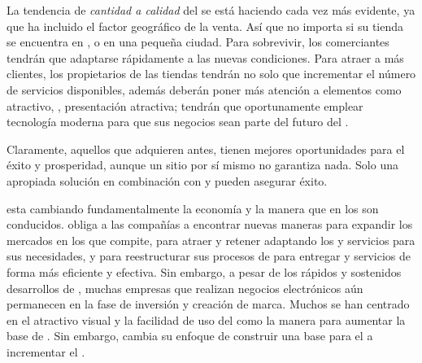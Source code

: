 			La tendencia de \textit{cantidad a calidad} del \ecommerceCOM se está haciendo cada vez más evidente, ya que \internetINT ha incluido el factor geográfico de la venta. Así que no importa si su tienda se encuentra en \newYorkNAME, \londresNAME o en una pequeña ciudad. Para sobrevivir, los comerciantes tendrán que adaptarse rápidamente a las nuevas condiciones. Para atraer a más clientes, los propietarios de las tiendas \online tendrán no solo que incrementar el número de servicios disponibles, además deberán poner más atención a elementos como \designQA atractivo, \userfriendliness, presentación atractiva; tendrán que oportunamente emplear tecnología moderna para que sus negocios sean parte del futuro del \ecommerceCOM.

			Claramente, aquellos que adquieren \estores antes, tienen mejores oportunidades  para el éxito y prosperidad, aunque un sitio \ecommerceCOM por sí mismo no garantiza nada. Solo una apropiada solución \ecommerceCOM en combinación con \emarketing y \advertising pueden asegurar éxito.

			\ecommerceCOM esta cambiando fundamentalmente la economía y la manera que en los \businessCOM son conducidos. \ecommerceCOM obliga a las compañías a encontrar nuevas maneras para expandir los mercados en los que compite, para atraer y retener \customersCOM adaptando los \itemsCOM y servicios para sus necesidades, y para reestructurar sus procesos de \businessCOM para entregar \itemsCOM y servicios de forma más eficiente y efectiva. Sin embargo, a pesar de los rápidos y sostenidos desarrollos de \ecommerceCOM, muchas empresas que realizan negocios electrónicos aún permanecen en la fase de inversión y creación de marca. Muchos \ebusinessCOM se han centrado en el atractivo visual y la facilidad de uso del \websiteINT como la manera para aumentar la base de \customersCOM. Sin embargo, \ebusinessCOM cambia su enfoque de construir una base para el \customerCOM a incrementar el  \cite{shin2001strategies}.

